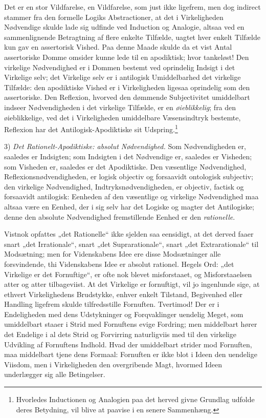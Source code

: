 \documentclass[12pt]{book}
\newcommand{\opage}[1]{\marginnote{\footnotesize\textit{[#1]}}}
\begin{document}
Det er en stor Vildfarelse, en Vildfarelse, som just ikke
\opage{275}ligefrem, men dog indirect stammer fra den formelle Logiks
Abstractioner, at det i Virkeligheden Nødvendige skulde lade
sig udfinde ved Induction og Analogie, altsaa ved en sammenlignende
Betragtning af flere enkelte Tilfælde, uagtet hver
enkelt Tilfælde kun gav en assertorisk Vished. Paa denne Maade
skulde da et vist Antal assertoriske Domme omsider kunne
lede til en apodiktisk; hvor tankeløst! Den virkelige Nødvendighed
er i Dommen bestemt ved oprindelig Indsigt i det
Virkelige selv; det Virkelige selv er i antilogisk Umiddelbarhed
det virkelige Tilfælde: den apodiktiske Vished er i Virkeligheden
ligesaa oprindelig som den assertoriske. Den Reflexion,
hvorved den dømmende Subjectivitet umiddelbart indseer Nødvendigheden
i det virkelige Tilfælde, er en \emph{øieblikkelig}; fra den
øieblikkelige, ved det i Virkeligheden umiddelbare Væsensindtryk
bestemte, Reflexion har det Antilogisk-Apodiktiske sit Udspring.\footnote{Hvorledes
Inductionen og Analogien paa det herved givne Grundlag
udfolde deres Betydning, vil blive at paavise i en senere
Sammenhæng.}%

3) \emph{Det Rationelt-Apodiktiske: absolut Nødvendighed.}
Som Nødvendigheden er, saaledes er Indsigten;
som Indsigten i det Nødvendige er, saaledes er Visheden;
som Visheden er, saaledes er det Apodiktiske. Den væsentlige
Nødvendighed, Reflexionsnødvendigheden, er logisk objectiv og
forsaavidt ontologisk subjectiv; den virkelige Nødvendighed, Indtryksnødvendigheden,
er objectiv, factisk og forsaavidt antilogisk:
Eenheden af den væsentlige og virkelige Nødvendighed maa
altsaa være en Eenhed, der i sig selv har det Logiske og
magter det Antilogiske; denne den absolute Nødvendighed fremstillende
Eenhed er den \emph{rationelle}.

Vistnok opfattes „det Rationelle“ ikke sjelden saa eensidigt,
at det derved faaer snart „det Irrationale“, snart „det Suprarationale“,
snart „det Extrarationale“ til Modsætning; men
for Videnskabens Idee ere disse Modsætninger alle forsvindende,
\opage{276}thi Videnskabens Idee er absolut rationel. Hegels Ord: „det
Virkelige er det Fornuftige“, er ofte nok blevet misforstaaet,
og Misforstaaelsen atter og atter tilbageviist. At det Virkelige
er fornuftigt, vil jo ingenlunde sige, at ethvert Virkelighedens
Brudstykke, enhver enkelt Tilstand, Begivenhed eller Handling
ligefrem skulde tilfredsstille Fornuften. Tvertimod! Der er
i Endeligheden med dens Udstykninger og Forqvaklinger uendelig
Meget, som umiddelbart staaer i Strid med Fornuftens
evige Fordring; men middelbart hører det Endelige i al dets
Strid og Forvirring naturligviis med til den virkelige Udvikling
af Fornuftens Indhold. Hvad der umiddelbart strider
mod Fornuften, maa middelbart tjene dens Formaal: Fornuften
er ikke blot i Ideen den uendelige Viisdom, men i
Virkeligheden den overgribende Magt, hvormed Ideen underlægger
sig alle Betingelser.
\end{document}
